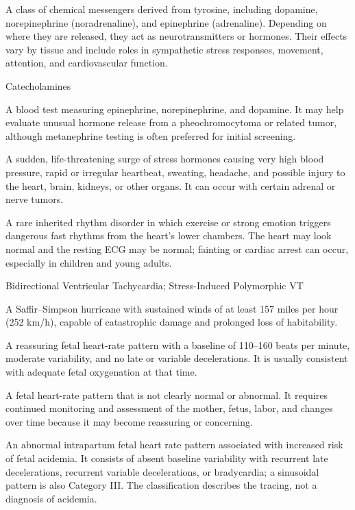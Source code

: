  A class of chemical messengers derived from tyrosine, including dopamine, norepinephrine (noradrenaline), and epinephrine (adrenaline). Depending on where they are released, they act as neurotransmitters or hormones. Their effects vary by tissue and include roles in sympathetic stress responses, movement, attention, and cardiovascular function.

\synonyms
Catecholamines

 A blood test measuring epinephrine, norepinephrine, and dopamine. It may help evaluate unusual hormone release from a pheochromocytoma or related tumor, although metanephrine testing is often preferred for initial screening.

 A sudden, life-threatening surge of stress hormones causing very high blood pressure, rapid or irregular heartbeat, sweating, headache, and possible injury to the heart, brain, kidneys, or other organs. It can occur with certain adrenal or nerve tumors.

 A rare inherited rhythm disorder in which exercise or strong emotion triggers dangerous fast rhythms from the heart's lower chambers. The heart may look normal and the resting ECG may be normal; fainting or cardiac arrest can occur, especially in children and young adults.

\synonyms
Bidirectional Ventricular Tachycardia; Stress-Induced Polymorphic VT

 A Saffir--Simpson hurricane with sustained winds of at least 157 miles per hour (252 km/h), capable of catastrophic damage and prolonged loss of habitability.

 A reassuring fetal heart-rate pattern with a baseline of 110--160 beats per minute, moderate variability, and no late or variable decelerations. It is usually consistent with adequate fetal oxygenation at that time.

 A fetal heart-rate pattern that is not clearly normal or abnormal. It requires continued monitoring and assessment of the mother, fetus, labor, and changes over time because it may become reassuring or concerning.

 An abnormal intrapartum fetal heart
rate pattern associated with increased risk of fetal acidemia. It consists of
absent baseline variability with recurrent late decelerations, recurrent
variable decelerations, or bradycardia; a sinusoidal pattern is also Category
III. The classification describes the tracing, not a diagnosis of acidemia.

